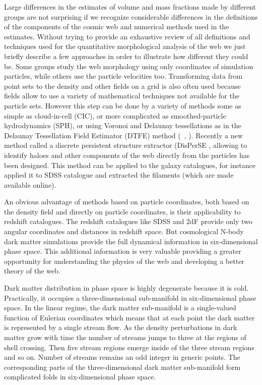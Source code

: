 Large differences in the estimates of volume and mass fractions made by different groups are not surprising if we recognize
considerable differences in the definitions of the components of the cosmic web and numerical methods used in the estimates. Without trying to provide an exhaustive review of all definitions and techniques used for the quantitative morphological 
analysis of the web  we just briefly describe a few approaches in order to illustrate how different they could be. 
Some groups study the web morphology using only coordinates of simulation particles, while others use the particle velocities too. 
Transforming data from  point sets to the density and other fields on a grid is also often used
because fields allow to use a variety of mathematical techniques not available for the particle sets.
However this step can be done by a variety of methods some as simple as cloud-in-cell (CIC), or more complicated as smoothed-particle hydrodynamics (SPH), 
or using Voronoi and Delaunay tessellations
as in the Delaunay Tessellation Field Estimator (DTFE) method (~\citealt{Weygaert2009}, \citealt{Cautun2014a}).  
Recently a new method called a discrete persistent structure extractor (DisPerSE \citealt{Sousbie2011a},  \citealt{Sousbie2011b} allowing to identify haloes and other components of the web directly from the particles 
has been designed.  This method can be applied to the galaxy catalogues, for instance \citet{Sousbie2011b} applied it to SDSS catalogue and extracted the filaments (which are made available online).

An obvious advantage of methods based on particle coordinates, both based on the density field and directly on particle coordinates, is their applicability to redshift catalogues. 
The redshift catalogues like SDSS and 2dF provide only two angular coordinates and distances in redshift space. 
But cosmological N-body dark matter simulations provide the full dynamical information in six-dimensional
phase space. This additional information is very valuable providing a greater opportunity for understanding the 
physics of the web and developing a better theory of the web.

Dark matter distribution in phase space is highly degenerate because it is cold. 
Practically, it occupies a three-dimensional sub-manifold in six-dimensional phase space.
 In the linear regime, the dark matter sub-manifold is a single-valued function of Eulerian coordinates 
 which means that at each point the dark matter is represented by a single stream flow. As the density perturbations in dark matter grow with time the number of streams jumps to three at the regions of
shell crossing. Then five stream regions emerge inside of the three stream regions and so on.
Number of streams remains an odd integer in generic points.   The corresponding parts of the three-dimensional dark matter sub-manifold 
form complicated folds in six-dimensional  phase space.   

